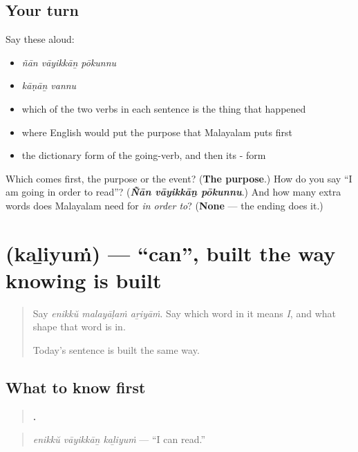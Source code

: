 \subsection*{Your turn}
Say these aloud:

\begin{itemize}
\raggedright
  \item \emph{ñān vāyikkāṉ pōkunnu}
  \item \emph{kāṇāṉ vannu}
  \item which of the two verbs in each sentence is the thing that happened
  \item where English would put the purpose that Malayalam puts first
  \item the dictionary form of the going-verb, and then its - form
\end{itemize}

\begin{tcolorbox}[breakable,colback=teal!4,colframe=teal!35!black,title={Before you move on}]
Which comes first, the purpose or the event? (\textbf{The purpose}.) How do you say \textquotedblleft{}I am going in order to read\textquotedblright{}? (\emph{\textbf{Ñān vāyikkāṉ pōkunnu}}.) And how many extra words does Malayalam need for \emph{in order to}? (\textbf{None} — the ending does it.)
\end{tcolorbox}
\section[\texorpdfstring{\ml{കഴിയും} (kaḻiyuṁ)}{കഴിയും (kaḻiyuṁ)}]{ (kaḻiyuṁ) — \textquotedblleft{}can\textquotedblright{}, built the way knowing is built}

\label{lesson:ML-C74-kazhiyum}



\begin{quote}
Say \emph{enikkŭ malayāḷaṁ aṟiyāṁ}. Say which word in it means \emph{I}, and what shape that word is in.

Today's sentence is built the same way.
\end{quote}

\subsection*{What to know first}
\begin{quote}
\textbf{  .}
\end{quote}

\begin{quote}
\emph{enikkŭ vāyikkāṉ kaḻiyuṁ} — \textquotedblleft{}I can read.\textquotedblright{}
\end{quote}

